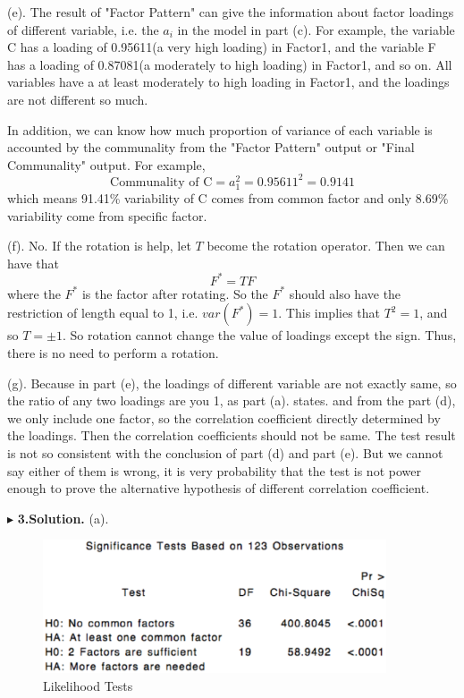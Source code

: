 \documentclass[letterpaper, 12pt]{article}
\begin{document}
(e). The result of "Factor Pattern" can give the information about factor loadings of different variable, i.e. the $a_i$ in the model in part (c). For example, the variable C has a loading of 0.95611(a very high loading) in Factor1, and the variable F has a loading of 0.87081(a moderately to high loading) in Factor1, and so on. All variables have a at least moderately to high loading in Factor1, and the loadings are not different so much.

In addition, we can know how much proportion of variance of each variable is accounted by the communality from the "Factor Pattern" output or "Final Communality" output. For example, 
$$
\text{Communality of C}=a_1^2=0.95611^2=0.9141
$$
which means 91.41\% variability of C comes from common factor and only 8.69\% variability come from specific factor.

(f). No. If the rotation is help, let $T$ become the rotation operator. Then we can have that
$$
F^*=TF
$$
where the $F^*$ is the factor after rotating. So the $F^*$ should also have the restriction of length equal to 1, i.e. $var(F^*)=1$. This implies that $T^2=1$, and so $T=\pm1$. So rotation cannot change the value of loadings except the sign. Thus, there is no need to perform a rotation.


(g). Because in part (e), the loadings of different variable are not exactly same, so the ratio of any two loadings are you 1, as part (a). states. and from the part (d), we only include one factor, so the correlation coefficient directly determined by the loadings. Then the correlation coefficients should not be same. The test result is not so consistent with the conclusion of part (d) and part (e). But we cannot say either of them is wrong, it is very probability that the test is not power enough to prove the alternative hypothesis of different correlation coefficient. 








$\blacktriangleright$ \textbf{3.\quad Solution.} 
(a). \begin{figure}[htbp]
\centering\includegraphics[width=4in]{7-6.eps}
\caption{Likelihood Tests}\label{6}
\end{figure}
\end{document}
